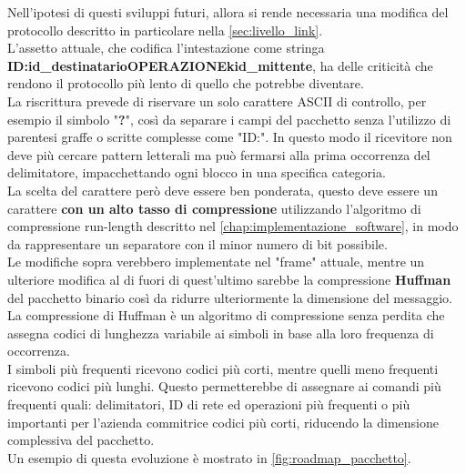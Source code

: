 Nell'ipotesi di questi sviluppi futuri, allora si rende necessaria una modifica del protocollo descritto in particolare nella \autoref{sec:livello_link}.\\ 
L'assetto attuale, che codifica l'intestazione come stringa \\ 
\textbf{ID:id\_destinatario{OPERAZIONE}k{id\_mittente}}, 
ha delle criticità che rendono il protocollo più lento di quello che potrebbe diventare.\\
 La riscrittura prevede di riservare un solo carattere ASCII di controllo, per esempio il simbolo 
 "\textbf{?}", così da separare i campi del pacchetto senza l'utilizzo di parentesi graffe o scritte complesse come "ID:".
  In questo modo il ricevitore non deve più cercare pattern letterali 
 ma può fermarsi alla prima occorrenza del delimitatore, impacchettando ogni blocco in una specifica categoria.\\
 La scelta del carattere però deve essere ben ponderata, questo deve essere un carattere \textbf{con un alto tasso di compressione} utilizzando l'algoritmo 
 di compressione run-length descritto nel \autoref{chap:implementazione_software}, in modo da rappresentare un separatore con il minor numero di bit possibile.\\
 Le modifiche sopra verebbero implementate nel "frame" attuale, mentre un ulteriore modifica al di fuori di quest'ultimo sarebbe la compressione \textbf{Huffman}
    del pacchetto binario così da ridurre ulteriormente la dimensione del messaggio.\\
    La compressione di Huffman è un algoritmo di compressione senza perdita che assegna codici di lunghezza variabile ai simboli in base alla loro frequenza di occorrenza. \\
     I simboli più frequenti ricevono codici più corti, mentre quelli meno frequenti ricevono codici più lunghi.
     \newpage  
     Questo permetterebbe di assegnare ai comandi più frequenti quali: delimitatori, ID di rete ed operazioni più frequenti o più importanti per l'azienda commitrice
        codici più corti, riducendo la dimensione complessiva del pacchetto.\\
        Un esempio di questa evoluzione è mostrato in \autoref{fig:roadmap_pacchetto}.

